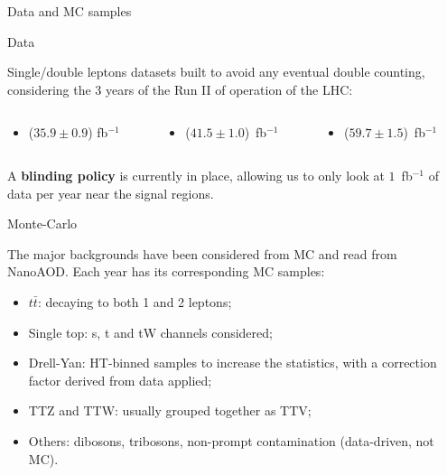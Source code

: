 \documentclass[8pt]{beamer}
\begin{document}
\begin{frame}{Data and MC samples}
\justifying
\begin{block}{\centering Data}\end{block}
\alert{Single/double leptons datasets} built to avoid any eventual double counting, considering the 3 years of the Run II of operation of the LHC:
\begin{columns}
\hspace{15pt}
	\begin{column}{0.32\textwidth}
		\begin{itemize}
		\item ($35.9 \pm 0.9$) fb$^{-1}$
		\end{itemize}
	\end{column} \hfill
	\begin{column}{0.32\textwidth}
		\begin{itemize}
		\item ($41.5 \pm 1.0$)~fb$^{-1}$
		\end{itemize}
	\end{column} \hfill
	\begin{column}{0.32\textwidth}
		\begin{itemize}
		\item ($59.7 \pm 1.5$)~fb$^{-1}$
		\end{itemize}
	\end{column} \hfill
\end{columns} \vfill
\vspace{5pt}
A \textbf{blinding policy} is currently in place, allowing us to only look at $1$~fb$^{-1}$ of data per year near the signal regions. \vfill
\vspace{10pt}
\begin{block}{\centering Monte-Carlo}\end{block}
The \alert{major backgrounds} have been considered from MC and read from NanoAOD. Each year has its corresponding MC samples:

\begin{itemize}
\justifying
\item $t \bar t$: decaying to both 1 and 2 leptons;%
\item Single top: s, t and tW channels considered;
\item Drell-Yan: HT-binned samples to increase the statistics, with a correction factor derived from data applied;
\item TTZ and TTW: usually grouped together as TTV;
\item Others: dibosons, tribosons, non-prompt contamination (data-driven, not MC).
\end{itemize} \vfill
\end{frame}
\end{document}
